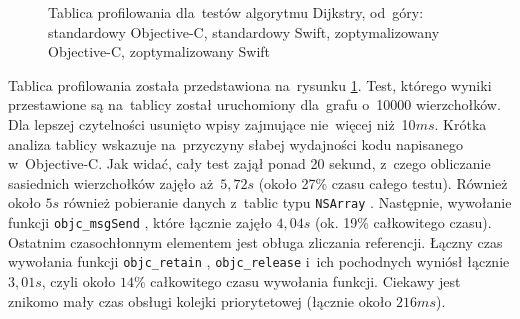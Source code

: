 \documentclass[mgr, shortabstract]{iithesis}
\newcommand{\objcinline}[1]{
    \texttt{#1}
}
\begin{document}
\begin{figure}
    \caption{Tablica profilowania dla~testów algorytmu Dijkstry, od~góry: standardowy Objective-C, standardowy Swift, zoptymalizowany Objective-C, zoptymalizowany Swift }
    \label{i:dijkstra}
\end{figure}

Tablica profilowania została przedstawiona na~rysunku \ref{i:dijkstra}. Test, którego wyniki przestawione są na~tablicy został uruchomiony dla~grafu o~10000 wierzchołków. Dla lepszej czytelności usunięto wpisy zajmujące nie~więcej niż 10$ms$. Krótka analiza tablicy wskazuje na~przyczyny słabej wydajności kodu napisanego w~Objective-C. Jak widać, cały test zajął ponad 20 sekund, z~czego obliczanie sasiednich wierzchołków zajęło aż~$5,72s$ (około 27\% czasu całego testu). Również około $5s$ również pobieranie danych z~tablic typu \objcinline{NSArray}. Następnie, wywołanie funkcji \objcinline{objc_msgSend}, które łącznie zajęło $4,04s$ (ok. 19\% całkowitego czasu). Ostatnim czasochłonnym elementem jest obługa zliczania referencji. Łączny czas wywołania funkcji \objcinline{objc_retain}, \objcinline{objc_release} i~ich pochodnych wyniósł łącznie $3,01s$, czyli około $14\%$ całkowitego czasu wywołania funkcji. Ciekawy jest znikomo mały czas obsługi kolejki priorytetowej (łącznie około $216ms$).
\end{document}
